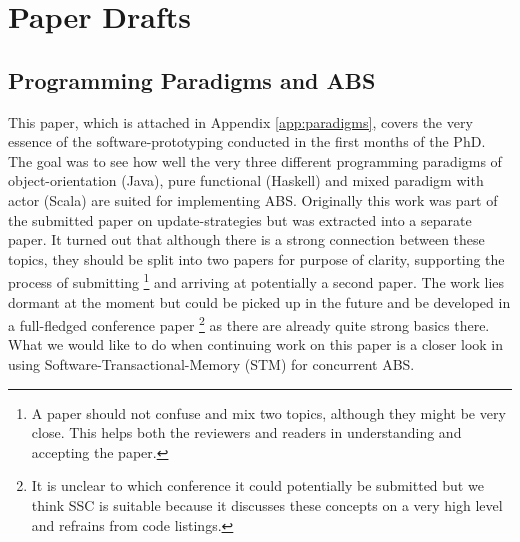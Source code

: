\section{Paper Drafts}
\subsection{Programming Paradigms and ABS}
This paper, which is attached in Appendix \ref{app:paradigms}, covers the very essence of the software-prototyping conducted in the first months of the PhD. The goal was to see how well the very three different programming paradigms of object-orientation (Java), pure functional (Haskell) and mixed paradigm with actor (Scala) are suited for implementing ABS. Originally this work was part of the submitted paper on update-strategies but was extracted into a separate paper. It turned out that although there is a strong connection between these topics, they should be split into two papers for purpose of clarity, supporting the process of submitting \footnote{A paper should not confuse and mix two topics, although they might be very close. This helps both the reviewers and readers in understanding and accepting the paper.} and arriving at potentially a second paper.
The work lies dormant at the moment but could be picked up in the future and be developed in a full-fledged conference paper \footnote{It is unclear to which conference it could potentially be submitted but we think SSC is suitable because it discusses these concepts on a very high level and refrains from code listings.} as there are already quite strong basics there. What we would like to do when continuing work on this paper is a closer look in using Software-Transactional-Memory (STM) for concurrent ABS.


